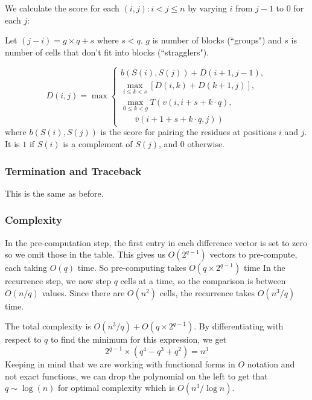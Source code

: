 \documentclass[journal]{IEEEtran}
\begin{document}
We calculate the score for each $(i, j) : i<j \leq n$ by varying $i$ from $j-1$ to $0$ for each $j$:

Let $(j-i) = g\times q +s$ where $s<q$. $g$ is number of blocks (``groups") and $s$ is number of cells that don't fit into blocks (``stragglers").

\begin{equation}\label{recurrence2}
D(i,j) = \max \begin{cases} b(S(i),S(j)) + D(i+1,j-1),\\
\max\limits_{i\leq k<s}[D(i,k) + D(k+1, j)],\\
\max\limits_{0\leq k<g} T\left( v(i,i+s+k\cdot q)\right.,\\ 
\hspace{20pt} \left.\overline{v}(i+1+s+k\cdot q, j) \right)


\end{cases}
\end{equation}
where $b(S(i),S(j))$ is the score for pairing the residues at positions $i$ and $j$. It is $1$ if $S(i)$ is a complement of $S(j)$, and $0$ otherwise.
\subsubsection{Termination and Traceback}
This is the same as before.

\subsubsection{Complexity}

In the pre-computation step, the first entry in each difference vector is set to zero so we omit those in the table. This gives us $O(2^{q-1})$ vectors to pre-compute, each taking $O(q)$ time. So pre-computing takes $O(q\times 2^{q-1})$ time In the recurrence step, we now step $q$ cells at a time, so the comparison is between $O(n/q)$ values. Since there are $O(n^2)$ cells, the recurrence takes $O(n^3/q)$ time.

The total complexity is $O(n^3/q) + O(q\times 2^{q-1})$. By differentiating with respect to $q$ to find the minimum for this expression, we get
\[
2^{q-1} \times (q^4 - q^3 + q^2)= {n^3}
\]
Keeping in mind that we are working with functional forms in $O$ notation and not exact functions, we can drop the polynomial on the left to get that $q \sim \log(n)$ for optimal complexity which is $O(n^3/\log n)$.
\end{document}
